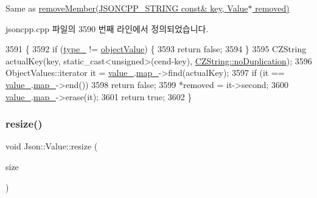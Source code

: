 Same as \hyperlink{class_json_1_1_value_ae385ecef98427970df525ee876e9f54a}{remove\+Member(\+J\+S\+O\+N\+C\+P\+P\+\_\+\+S\+T\+R\+I\+N\+G const\& key, Value$\ast$ removed)} 



jsoncpp.\+cpp 파일의 3590 번째 라인에서 정의되었습니다.


\begin{DoxyCode}
3591 \{
3592   \textcolor{keywordflow}{if} (\hyperlink{class_json_1_1_value_abd222c2536dc88bf330dedcd076d2356}{type\_} != \hyperlink{namespace_json_a7d654b75c16a57007925868e38212b4eae8386dcfc36d1ae897745f7b4f77a1f6}{objectValue}) \{
3593     \textcolor{keywordflow}{return} \textcolor{keyword}{false};
3594   \}
3595   CZString actualKey(key, static\_cast<unsigned>(cend-key), 
      \hyperlink{class_json_1_1_value_1_1_c_z_string_a2805c46fb4a72bbaed55de6d75941b6da08d540450fa6c4af57eaacf063eedd20}{CZString::noDuplication});
3596   ObjectValues::iterator it = \hyperlink{class_json_1_1_value_aef578244546212705b9f81eb84d7e151}{value\_}.\hyperlink{union_json_1_1_value_1_1_value_holder_a1e7a5b86d4f52234f55c847ad1ce389a}{map\_}->find(actualKey);
3597   \textcolor{keywordflow}{if} (it == \hyperlink{class_json_1_1_value_aef578244546212705b9f81eb84d7e151}{value\_}.\hyperlink{union_json_1_1_value_1_1_value_holder_a1e7a5b86d4f52234f55c847ad1ce389a}{map\_}->end())
3598     \textcolor{keywordflow}{return} \textcolor{keyword}{false};
3599   *removed = it->second;
3600   \hyperlink{class_json_1_1_value_aef578244546212705b9f81eb84d7e151}{value\_}.\hyperlink{union_json_1_1_value_1_1_value_holder_a1e7a5b86d4f52234f55c847ad1ce389a}{map\_}->erase(it);
3601   \textcolor{keywordflow}{return} \textcolor{keyword}{true};
3602 \}
\end{DoxyCode}
\mbox{\label{class_json_1_1_value_aa284353271ada427dbfa04a42f2be407}} 
\subsubsection{\texorpdfstring{resize()}{resize()}}
{\footnotesize\ttfamily void Json\+::\+Value\+::resize (\begin{DoxyParamCaption}\item[{\hyperlink{class_json_1_1_value_a184a91566cccca7b819240f0d5561c7d}{Array\+Index}}]{size }\end{DoxyParamCaption})}

